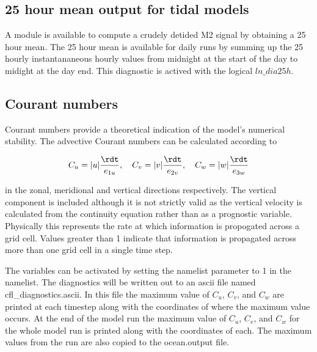 \documentclass[../main/NEMO_manual]{subfiles}
\begin{document}
\begin{listing}
  \caption{}
  \label{lst:namptr}
\end{listing}

\subsection{25 hour mean output for tidal models}

\begin{listing}
  \caption{}
  \label{lst:nam_dia25h}
\end{listing}

A module is available to compute a crudely detided M2 signal by obtaining a 25 hour mean.
The 25 hour mean is available for daily runs by summing up the 25 hourly instantananeous hourly values from
midnight at the start of the day to midight at the day end.
This diagnostic is actived with the logical $ln\_dia25h$.

\subsection{Courant numbers}

Courant numbers provide a theoretical indication of the model's numerical stability.
The advective Courant numbers can be calculated according to

\[
  C_u = |u|\frac{\rdt}{e_{1u}}, \quad C_v = |v|\frac{\rdt}{e_{2v}}, \quad C_w = |w|\frac{\rdt}{e_{3w}}
\]

in the zonal, meridional and vertical directions respectively.
The vertical component is included although it is not strictly valid as the vertical velocity is calculated from
the continuity equation rather than as a prognostic variable.
Physically this represents the rate at which information is propogated across a grid cell.
Values greater than 1 indicate that information is propagated across more than one grid cell in a single time step.

The variables can be activated by setting the  namelist parameter to 1 in the  namelist.
The diagnostics will be written out to an ascii file named cfl\_diagnostics.ascii.
In this file the maximum value of $C_u$, $C_v$, and $C_w$ are printed at each timestep along with the coordinates of
where the maximum value occurs.
At the end of the model run the maximum value of $C_u$, $C_v$, and $C_w$ for the whole model run is printed along
with the coordinates of each.
The maximum values from the run are also copied to the ocean.output file.

\subinc{}
\end{document}
